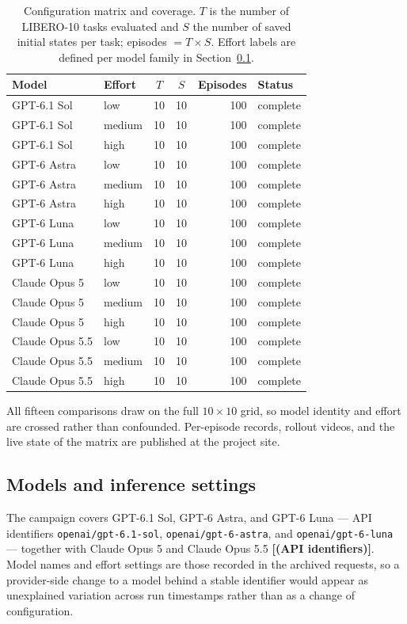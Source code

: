 \documentclass[11pt]{article}
\newcommand{\placeholder}[1]{\textbf{[#1]}}
\begin{document}
\begin{table}[h]
\centering
\caption{Configuration matrix and coverage. $T$ is the number of LIBERO-10
tasks evaluated and $S$ the number of saved initial states per task; episodes
$=T\times S$. Effort labels are defined per model family in
Section~\ref{sec:models}.}
\label{tab:coverage}
\small
\begin{tabular}{llccrl}
\toprule
Model & Effort & $T$ & $S$ & Episodes & Status \\
\midrule
GPT-6.1 Sol     & low    & 10 & 10 & 100 & complete \\
GPT-6.1 Sol     & medium & 10 & 10 & 100 & complete \\
GPT-6.1 Sol     & high   & 10 & 10 & 100 & complete \\
GPT-6 Astra     & low    & 10 & 10 & 100 & complete \\
GPT-6 Astra     & medium & 10 & 10 & 100 & complete \\
GPT-6 Astra     & high   & 10 & 10 & 100 & complete \\
GPT-6 Luna      & low    & 10 & 10 & 100 & complete \\
GPT-6 Luna      & medium & 10 & 10 & 100 & complete \\
GPT-6 Luna      & high   & 10 & 10 & 100 & complete \\
\midrule
Claude Opus 5   & low    & 10 & 10 & 100 & complete \\
Claude Opus 5   & medium & 10 & 10 & 100 & complete \\
Claude Opus 5   & high   & 10 & 10 & 100 & complete \\
Claude Opus 5.5 & low    & 10 & 10 & 100 & complete \\
Claude Opus 5.5 & medium & 10 & 10 & 100 & complete \\
Claude Opus 5.5 & high   & 10 & 10 & 100 & complete \\
\bottomrule
\end{tabular}
\end{table}

All fifteen comparisons draw on the full $10\times10$ grid, so model identity
and effort are crossed rather than confounded. Per-episode
records, rollout videos, and the live state of the matrix are published at the
project site.

\subsection{Models and inference settings}
\label{sec:models}
The campaign covers GPT-6.1 Sol, GPT-6 Astra, and GPT-6 Luna --- API
identifiers \texttt{openai/gpt-6.1-sol}, \texttt{openai/gpt-6-astra}, and
\texttt{openai/gpt-6-luna} --- together with Claude Opus 5 and Claude Opus 5.5
\placeholder{(API identifiers)}. Model names and effort settings are those
recorded in the archived requests, so a provider-side change to a model behind
a stable identifier would appear as unexplained variation across run
timestamps rather than as a change of configuration.
\end{document}
